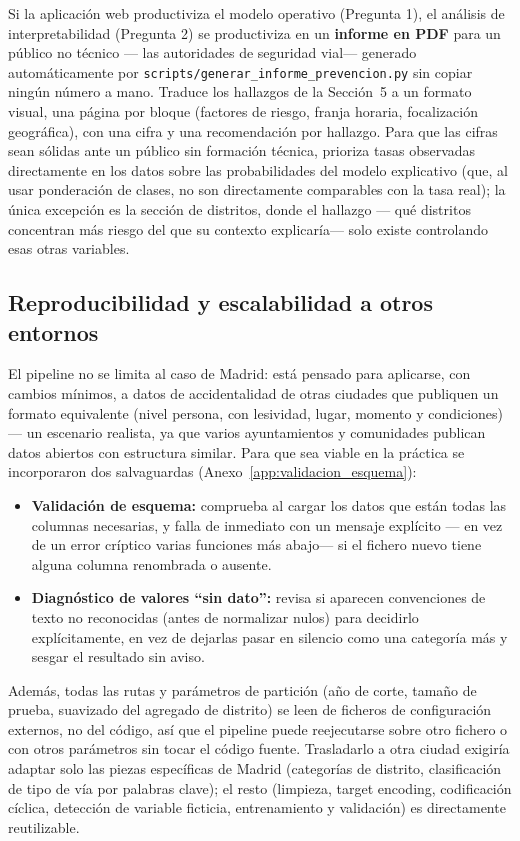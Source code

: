 \documentclass[11pt,a4paper]{article}
\begin{document}
Si la aplicación web productiviza el modelo operativo (Pregunta 1), el análisis de interpretabilidad (Pregunta 2) se productiviza en un \textbf{informe en PDF} para un público no técnico --- las autoridades de seguridad vial--- generado automáticamente por \texttt{scripts/generar\_informe\_prevencion.py} sin copiar ningún número a mano. Traduce los hallazgos de la Sección~5 a un formato visual, una página por bloque (factores de riesgo, franja horaria, focalización geográfica), con una cifra y una recomendación por hallazgo. Para que las cifras sean sólidas ante un público sin formación técnica, prioriza tasas observadas directamente en los datos sobre las probabilidades del modelo explicativo (que, al usar ponderación de clases, no son directamente comparables con la tasa real); la única excepción es la sección de distritos, donde el hallazgo --- qué distritos concentran más riesgo del que su contexto explicaría--- solo existe controlando esas otras variables.

\subsection{Reproducibilidad y escalabilidad a otros entornos}
\label{sec:reproducibilidad}

El pipeline no se limita al caso de Madrid: está pensado para aplicarse, con cambios mínimos, a datos de accidentalidad de otras ciudades que publiquen un formato equivalente (nivel persona, con lesividad, lugar, momento y condiciones) --- un escenario realista, ya que varios ayuntamientos y comunidades publican datos abiertos con estructura similar. Para que sea viable en la práctica se incorporaron dos salvaguardas (Anexo~\ref{app:validacion_esquema}):

\begin{itemize}[nosep]
\item \textbf{Validación de esquema:} comprueba al cargar los datos que están todas las columnas necesarias, y falla de inmediato con un mensaje explícito --- en vez de un error críptico varias funciones más abajo--- si el fichero nuevo tiene alguna columna renombrada o ausente.
\item \textbf{Diagnóstico de valores ``sin dato'':} revisa si aparecen convenciones de texto no reconocidas (antes de normalizar nulos) para decidirlo explícitamente, en vez de dejarlas pasar en silencio como una categoría más y sesgar el resultado sin aviso.
\end{itemize}

Además, todas las rutas y parámetros de partición (año de corte, tamaño de prueba, suavizado del agregado de distrito) se leen de ficheros de configuración externos, no del código, así que el pipeline puede reejecutarse sobre otro fichero o con otros parámetros sin tocar el código fuente. Trasladarlo a otra ciudad exigiría adaptar solo las piezas específicas de Madrid (categorías de distrito, clasificación de tipo de vía por palabras clave); el resto (limpieza, target encoding, codificación cíclica, detección de variable ficticia, entrenamiento y validación) es directamente reutilizable.
\end{document}
